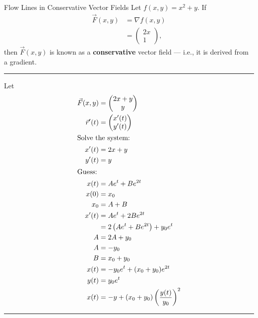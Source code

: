 \documentclass[8pt]{extarticle}
\begin{document}
  \begin{problem}{Flow Lines in Conservative Vector Fields}
    Let $f(x,y) = x^2 + y$. If
    \begin{align*}
      \vec{F}(x,y) &= \nabla f(x,y)\\
                   &= \begin{pmatrix}2x\\1\end{pmatrix},
    \end{align*}
    then $\vec{F}(x,y)$ is known as a \textbf{conservative} vector field --- i.e., it is derived from a gradient.\\
    \vspace{4pt}
    \rule{\textwidth}{0.4pt}
    \vspace{4pt}
    Let
    \begin{align*}
      \vec{F}(x,y) &= \begin{pmatrix}2x+y\\y\end{pmatrix}\\
      \vec{r}'(t) &= \begin{pmatrix}x'(t)\\y'(t)\end{pmatrix}\\
      \shortintertext{Solve the system:}
                 x'(t) &= 2x + y\\
                 y'(t) &= y\\
                 \shortintertext{Guess:}
                 x(t) &= Ae^{t} + Be^{2t}\\
                 x(0) &= x_0\\
                 x_0 &= A + B\\
                 x'(t) &= Ae^{t} + 2Be^{2t}\\
                       &= 2\left(Ae^{t} + Be^{2t}\right) + y_0e^{t}\\
                 A &= 2A + y_0\\
                 A &= -y_0\\
                 B &= x_0 + y_0\\
                 x(t) &= -y_0 e^{t} + (x_0 + y_0)e^{2t}\\
                 y(t) &= y_0e^{t}\\
                 x(t) &= -y + (x_0 + y_0)\left(\frac{y(t)}{y_0}\right)^{2}
    \end{align*}
    \vspace{4pt}
    \rule{\textwidth}{0.4pt}
    \vspace{4pt}

\end{problem}
\end{document}
